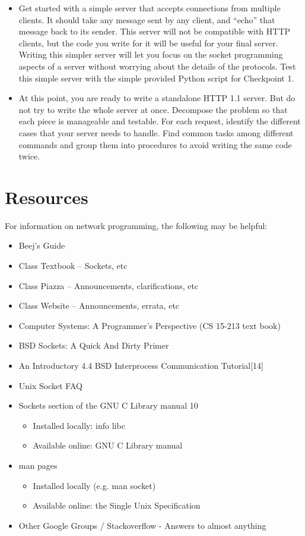 \documentclass[12pt]{article}
\begin{document}
\begin{itemize}
\item Get started with a simple server that accepts connections from multiple clients. It should take any message sent by any client, and “echo” that message back to its sender. This server will not be compatible with HTTP clients, but the code you write for it will be useful for your final server. Writing this simpler server will let you focus on the socket programming aspects of a server without worrying about the details of the protocols. Test this simple server with the simple provided Python script for Checkpoint 1.
\item At this point, you are ready to write a standalone HTTP 1.1 server. But do not try to write the whole server at once. Decompose the problem so that each piece is manageable and testable. For each request, identify the different cases that your server needs to handle. Find common tasks among different commands and group them into procedures to avoid writing the same code twice.
\end{itemize}

\section{Resources}

For information on network programming, the following may be helpful:
\begin{itemize}


 \item Beej’s Guide
 \item  Class Textbook – Sockets, etc
 \item  Class Piazza – Announcements, clarifications, etc
\item  Class Website – Announcements, errata, etc
\item  Computer Systems: A Programmer’s Perspective (CS 15-213 text book)
\item  BSD Sockets: A Quick And Dirty Primer
\item  An Introductory 4.4 BSD Interprocess Communication Tutorial[14]
\item  Unix Socket FAQ
\item  Sockets section of the GNU C Library manual
10
\begin{itemize}
\item  Installed locally: info libc
\item Available online: GNU C Library manual
\end{itemize}

\item  man pages
\begin{itemize}
\item  Installed locally (e.g. man socket)
\item Available online: the Single Unix Specification
\end{itemize}
\item  Other Google Groups / Stackoverflow - Answers to almost anything
\end{itemize}



\end{document}
